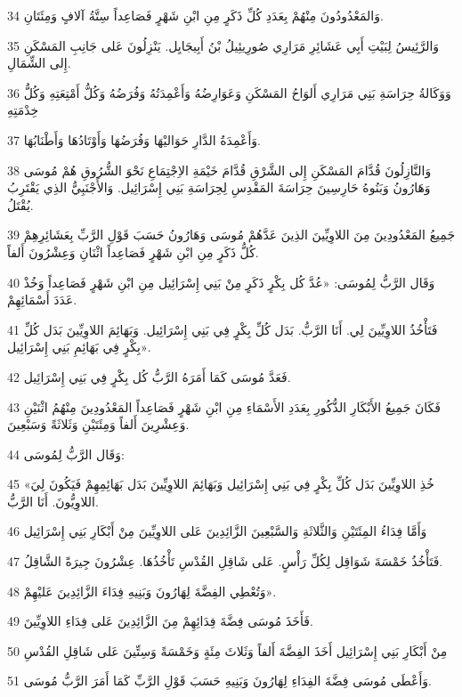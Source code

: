 \par 34 وَالمَعْدُودُونَ مِنْهُمْ بِعَدَدِ كُلِّ ذَكَرٍ مِنِ ابْنِ شَهْرٍ فَصَاعِداً سِتَّةُ آلافٍ وَمِئَتَانِ.
\par 35 وَالرَّئِيسُ لِبَيْتِ أَبِي عَشَائِرِ مَرَارِي صُورِيئِيلُ بْنُ أَبِيجَايِل. يَنْزِلُونَ عَلى جَانِبِ المَسْكَنِ إِلى الشِّمَالِ.
\par 36 وَوَكَالةُ حِرَاسَةِ بَنِي مَرَارِي أَلوَاحُ المَسْكَنِ وَعَوَارِضُهُ وَأَعْمِدَتُهُ وَفُرَضُهُ وَكُلُّ أَمْتِعَتِهِ وَكُلُّ خِدْمَتِهِ
\par 37 وَأَعْمِدَةُ الدَّارِ حَوَاليْهَا وَفُرَضُهَا وَأَوْتَادُهَا وَأَطْنَابُهَا.
\par 38 وَالنَّازِلُونَ قُدَّامَ المَسْكَنِ إِلى الشَّرْقِ قُدَّامَ خَيْمَةِ الاِجْتِمَاعِ نَحْوَ الشُّرُوقِ هُمْ مُوسَى وَهَارُونُ وَبَنُوهُ حَارِسِينَ حِرَاسَةَ المَقْدِسِ لِحِرَاسَةِ بَنِي إِسْرَائِيل. وَالأَجْنَبِيُّ الذِي يَقْتَرِبُ يُقْتَلُ.
\par 39 جَمِيعُ المَعْدُودِينَ مِنَ اللاوِيِّينَ الذِينَ عَدَّهُمْ مُوسَى وَهَارُونُ حَسَبَ قَوْلِ الرَّبِّ بِعَشَائِرِهِمْ كُلُّ ذَكَرٍ مِنِ ابْنِ شَهْرٍ فَصَاعِداً اثْنَانِ وَعِشْرُونَ أَلفاً.
\par 40 وَقَال الرَّبُّ لِمُوسَى: «عُدَّ كُل بِكْرٍ ذَكَرٍ مِنْ بَنِي إِسْرَائِيل مِنِ ابْنِ شَهْرٍ فَصَاعِداً وَخُذْ عَدَدَ أَسْمَائِهِمْ.
\par 41 فَتَأْخُذُ اللاوِيِّينَ لِي. أَنَا الرَّبُّ. بَدَل كُلِّ بِكْرٍ فِي بَنِي إِسْرَائِيل. وَبَهَائِمَ اللاوِيِّينَ بَدَل كُلِّ بِكْرٍ فِي بَهَائِمِ بَنِي إِسْرَائِيل».
\par 42 فَعَدَّ مُوسَى كَمَا أَمَرَهُ الرَّبُّ كُل بِكْرٍ فِي بَنِي إِسْرَائِيل.
\par 43 فَكَانَ جَمِيعُ الأَبْكَارِ الذُّكُورِ بِعَدَدِ الأَسْمَاءِ مِنِ ابْنِ شَهْرٍ فَصَاعِداً المَعْدُودِينَ مِنْهُمُ اثْنَيْنِ وَعِشْرِينَ أَلفاً وَمِئَتَيْنِ وَثَلاثَةً وَسَبْعِينَ.
\par 44 وَقَال الرَّبُّ لِمُوسَى:
\par 45 «خُذِ اللاوِيِّينَ بَدَل كُلِّ بِكْرٍ فِي بَنِي إِسْرَائِيل وَبَهَائِمَ اللاوِيِّينَ بَدَل بَهَائِمِهِمْ فَيَكُونَ لِيَ اللاوِيُّونَ. أَنَا الرَّبُّ.
\par 46 وَأَمَّا فِدَاءُ المِئَتَيْنِ وَالثَّلاثَةِ وَالسَّبْعِينَ الزَّائِدِينَ عَلى اللاوِيِّينَ مِنْ أَبْكَارِ بَنِي إِسْرَائِيل
\par 47 فَتَأْخُذُ خَمْسَةَ شَوَاقِل لِكُلِّ رَأْسٍ. عَلى شَاقِلِ القُدْسِ تَأْخُذُهَا. عِشْرُونَ جِيرَةً الشَّاقِلُ.
\par 48 وَتُعْطِي الفِضَّةَ لِهَارُونَ وَبَنِيهِ فِدَاءَ الزَّائِدِينَ عَليْهِمْ».
\par 49 فَأَخَذَ مُوسَى فِضَّةَ فِدَائِهِمْ مِنَ الزَّائِدِينَ عَلى فِدَاءِ اللاوِيِّينَ.
\par 50 مِنْ أَبْكَارِ بَنِي إِسْرَائِيل أَخَذَ الفِضَّةَ أَلفاً وَثَلاثَ مِئَةٍ وَخَمْسَةً وَسِتِّينَ عَلى شَاقِلِ القُدْسِ
\par 51 وَأَعْطَى مُوسَى فِضَّةَ الفِدَاءِ لِهَارُونَ وَبَنِيهِ حَسَبَ قَوْلِ الرَّبِّ كَمَا أَمَرَ الرَّبُّ مُوسَى.

